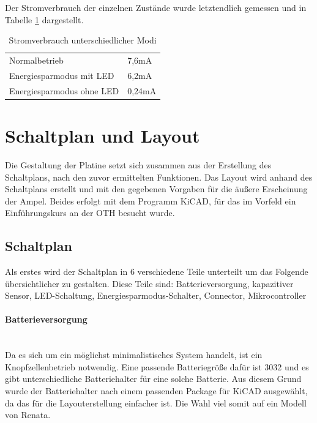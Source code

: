 \documentclass[a4paper,
DIV=13,
12pt,
BCOR=10mm,
department=FakEI,
parskip=half,
automark,
]{article}
\begin{document}
Der Stromverbrauch der einzelnen Zustände wurde letztendlich gemessen und in Tabelle \ref{tab:ADEinton} dargestellt.

\begin{table}[h]
\begin{center}
\begin{tabularx}{\columnwidth}{XX}
Normalbetrieb & 7,6mA \\ 
Energiesparmodus mit LED & 6,2mA\\
Energiesparmodus ohne LED & 0,24mA
\label{tab:ADEinton}
\end{tabularx}
\end{center}
\caption{Stromverbrauch unterschiedlicher Modi}
\end{table}





\newpage
\section{Schaltplan und Layout}

Die Gestaltung der Platine setzt sich zusammen aus der Erstellung des Schaltplans, nach den zuvor ermittelten Funktionen. Das Layout wird anhand des Schaltplans erstellt und mit den gegebenen Vorgaben für die äußere Erscheinung der Ampel. Beides erfolgt mit dem Programm KiCAD, für das im Vorfeld ein Einführungskurs an der OTH besucht wurde.

\subsection{Schaltplan}

Als erstes wird der Schaltplan in 6 verschiedene Teile unterteilt um das Folgende übersichtlicher zu gestalten. Diese Teile sind: Batterieversorgung, kapazitiver Sensor, LED-Schaltung, Energiesparmodus-Schalter, Connector, Mikrocontroller


\paragraph{Batterieversorgung} $~$ \\

Da es sich um ein möglichst minimalistisches System handelt, ist ein Knopfzellenbetrieb notwendig. Eine passende Batteriegröße dafür ist 3032 und es gibt unterschiedliche Batteriehalter für eine solche Batterie. Aus diesem Grund wurde der Batteriehalter nach einem passenden Package für KiCAD ausgewählt, da das für die Layouterstellung einfacher ist. Die Wahl viel somit auf ein Modell von Renata. 
\end{document}
